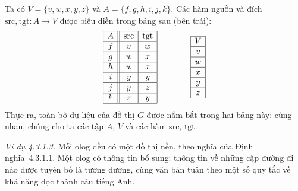 Ta có $V=\{v,w,x,y,z\}$ và $A=\{f,g,h,i,j,k\}$. Các hàm nguồn và đích $\mathrm{src},\mathrm{tgt}:A\to V$ được biểu diễn trong bảng sau (bên trái):
\[
\begin{array}{|c||c|c|}\hline
A&\mathrm{src}&\mathrm{tgt}\\\hline
f&v&w\\\hline g&w&x\\\hline h&w&x\\\hline
i&y&y\\\hline j&y&z\\\hline k&z&y\\\hline
\end{array}
\qquad\qquad
\begin{array}{|c|}\hline V\\\hline v\\\hline w\\\hline x\\\hline y\\\hline z\\\hline\end{array}
\]
Thực ra, toàn bộ dữ liệu của đồ thị $G$ được nắm bắt trong hai bảng này: cùng nhau, chúng cho ta các tập $A$, $V$ và các hàm $\mathrm{src}$, $\mathrm{tgt}$.

\noindent\textit{Ví dụ 4.3.1.3.} Mỗi olog đều có một đồ thị nền, theo nghĩa của Định nghĩa~4.3.1.1. Một olog có thông tin bổ sung: thông tin về những cặp đường đi nào được tuyên bố là tương đương, cùng văn bản tuân theo một số quy tắc về khả năng đọc thành câu tiếng Anh.

